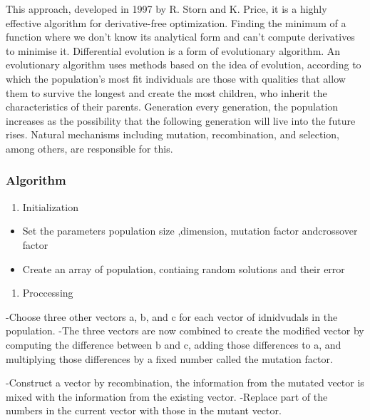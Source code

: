 \documentclass[
]{article}
\providecommand{\tightlist}{%
  \setlength{\itemsep}{0pt}\setlength{\parskip}{0pt}}
\begin{document}
This approach, developed in 1997 by R. Storn and K. Price, it is a
highly effective algorithm for derivative-free optimization. Finding the
minimum of a function where we don't know its analytical form and can't
compute derivatives to minimise it. Differential evolution is a form of
evolutionary algorithm. An evolutionary algorithm uses methods based on
the idea of evolution, according to which the population's most fit
individuals are those with qualities that allow them to survive the
longest and create the most children, who inherit the characteristics of
their parents. Generation every generation, the population increases as
the possibility that the following generation will live into the future
rises. Natural mechanisms including mutation, recombination, and
selection, among others, are responsible for this.

\hypertarget{algorithm-1}{%
\subsubsection{Algorithm}\label{algorithm-1}}

\begin{enumerate}
\def\labelenumi{\Roman{enumi})}
\tightlist
\item
  Initialization
\end{enumerate}

\begin{itemize}
\tightlist
\item
  Set the parameters population size ,dimension, mutation factor
  andcrossover factor
\item
  Create an array of population, contiaing random solutions and their
  error
\end{itemize}

\begin{enumerate}
\def\labelenumi{\Roman{enumi})}
\setcounter{enumi}{1}
\tightlist
\item
  Proccessing
\end{enumerate}

-Choose three other vectors a, b, and c for each vector of idnidvudals
in the population. -The three vectors are now combined to create the
modified vector by computing the difference between b and c, adding
those differences to a, and multiplying those differences by a fixed
number called the mutation factor.

-Construct a vector by recombination, the information from the mutated
vector is mixed with the information from the existing vector. -Replace
part of the numbers in the current vector with those in the mutant
vector.
\end{document}
